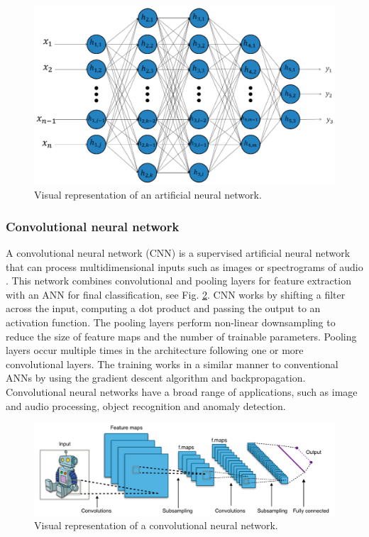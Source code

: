 \documentclass[conference, 11pt]{IEEEtran}
\begin{document}
    \begin{figure}[htbp]
        \centerline{\includegraphics[width=\linewidth]{figures/ann.jpg}}
        \caption{Visual representation of an artificial neural network. \cite{article:18}}
        \label{fig:ann}
    \end{figure}

    \subsubsection{Convolutional neural network}
    A convolutional neural network (CNN) is a supervised artificial neural network that can process multidimensional inputs such as images or spectrograms of audio \cite{lecun1995convolutional}.
    This network combines convolutional and pooling layers for feature extraction with an ANN for final classification, see Fig. \ref{fig:cnn}.
    CNN works by shifting a filter across the input, computing a dot product and passing the output to an activation function.
    The pooling layers perform non-linear downsampling to reduce the size of feature maps and the number of trainable parameters.
    Pooling layers occur multiple times in the architecture following one or more convolutional layers.
    The training works in a similar manner to conventional ANNs by using the gradient descent algorithm and backpropagation.
    Convolutional neural networks have a broad range of applications, such as image and audio processing, object recognition and anomaly detection.

    \begin{figure}[htbp]
        \centerline{\includegraphics[width=\linewidth]{figures/cnn2.png}}
        \caption{Visual representation of a convolutional neural network. \cite{ConvNet}}
        \label{fig:cnn}
    \end{figure}
\end{document}
